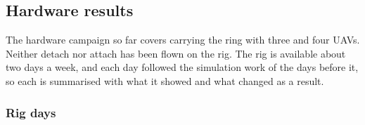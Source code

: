 
\subsection{Hardware results}
\label{sec:rig_results}

The hardware campaign so far covers carrying the ring with three and four UAVs. Neither detach nor
attach has been flown on the rig. The rig is available about two days a week, and each day
followed the simulation work of the days before it, so each is summarised with what it showed and
what changed as a result.

\subsubsection{Rig days}

